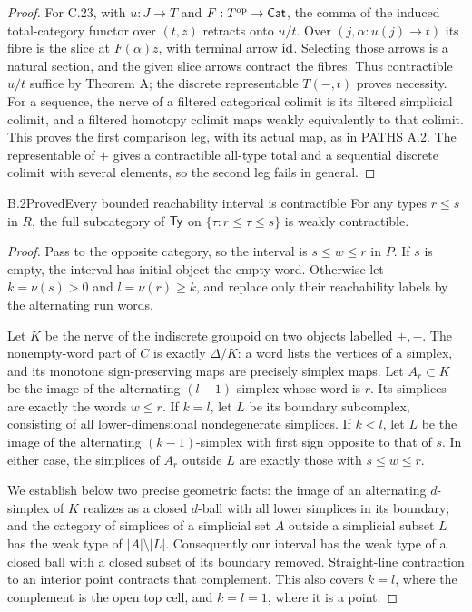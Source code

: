\begin{proof}
For C.23, with $u:J\to T$ and $F:T^{\mathrm{op}}\to\mathsf{Cat}$, the comma of
the induced total-category functor over $(t,z)$ retracts onto
$u/t$. Over $(j,\alpha:u(j)\to t)$ its fibre is the slice at
$F(\alpha)z$, with terminal arrow $\mathrm{id}$. Selecting those arrows
is a natural section, and the given slice arrows contract the
fibres. Thus contractible $u/t$ suffice by Theorem A; the discrete
representable $T(-,t)$ proves necessity. For a sequence, the nerve
of a filtered categorical colimit is its filtered simplicial
colimit, and a filtered homotopy colimit maps weakly equivalently
to that colimit. This proves the first comparison leg, with its
actual map, as in PATHS A.2. The representable of $+$ gives a
contractible all-type total and a sequential discrete colimit
with several elements, so the second leg fails in general.
\end{proof}

\begin{claim}{B.2}{Proved}{Every bounded reachability interval is contractible}
\label{B:interval}
For any types $r\leq s$ in $R$, the full subcategory of $\mathsf{Ty}$
on $\{\tau:r\leq\tau\leq s\}$ is weakly contractible.
\end{claim}
\begin{proof}
Pass to the opposite category, so the interval is $s\leq w\leq r$
in $P$. If $s$ is empty, the interval has initial object the empty
word. Otherwise let $k=\nu(s)>0$ and $l=\nu(r)\geq k$, and replace
only their reachability labels by the alternating run words.

Let $K$ be the nerve of the indiscrete groupoid on two objects
labelled $+,-$. The nonempty-word part of $C$ is exactly
$\Delta/K$: a word lists the vertices of a simplex, and its
monotone sign-preserving maps are precisely simplex maps. Let
$A_r\subset K$ be the image of the alternating $(l-1)$-simplex
whose word is $r$. Its simplices are exactly the words $w\leq r$.
If $k=l$, let $L$ be its boundary subcomplex, consisting of all
lower-dimensional nondegenerate simplices. If $k<l$, let $L$ be
the image of the alternating $(k-1)$-simplex with first sign
opposite to that of $s$. In either case, the simplices of $A_r$
outside $L$ are exactly those with $s\leq w\leq r$.

We establish below two precise geometric facts: the image of an
alternating $d$-simplex of $K$ realizes as a closed $d$-ball with
all lower simplices in its boundary; and the category of simplices
of a simplicial set $A$ outside a simplicial subset $L$ has the
weak type of $|A|\setminus|L|$. Consequently our interval has the
weak type of a closed ball with a closed subset of its boundary
removed. Straight-line contraction to an interior point contracts
that complement. This also covers $k=l$, where the complement is
the open top cell, and $k=l=1$, where it is a point.


\end{proof}

